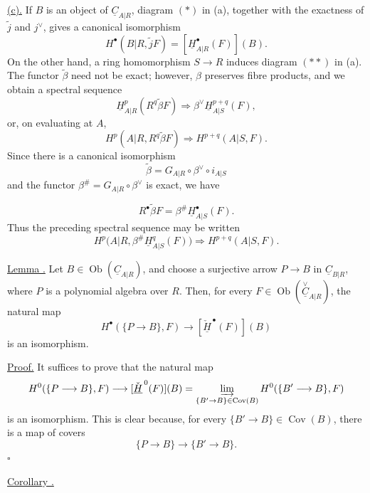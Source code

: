 \underline{(c).} If $B$ is an object of
$\underline C_{A|R}$, diagram $(*)$ in (a), together with the
exactness of $\widetilde j$ and $j^{\vee}$, gives a canonical
isomorphism
\[
 H^{\bullet}(B|R,\widetilde jF)=
 [\underline H^{\bullet}_{A|R}(F)](B).
\]
On the other hand, a ring homomorphism $S\longrightarrow R$ induces
diagram $(**)$ in (a). The functor $\widetilde\beta$ need not be
exact; however, $\beta$ preserves fibre products, and we obtain a
spectral sequence
\[
 \underline H^p_{A|R}(R^q\widetilde\beta F)
 \Longrightarrow
 \beta^{\vee}\underline H^{p+q}_{A|S}(F),
\]
or, on evaluating at $A$,
\[
 H^p(A|R,R^q\widetilde\beta F)
 \Longrightarrow H^{p+q}(A|S,F).
\]
Since there is a canonical isomorphism
\[
 \widetilde\beta=
 G_{A|R}\circ\beta^{\vee}\circ i_{A|S}
\]
and the functor
$\beta^{\#}=G_{A|R}\circ\beta^{\vee}$ is exact, we have


\[
 R^{\bullet}\widetilde\beta F=
 \beta^{\#}\underline H^{\bullet}_{A|S}(F).
\]
Thus the preceding spectral sequence may be written
\[
 H^p\bigl(A|R,\beta^{\#}\underline H^q_{A|S}(F)\bigr)
 \Longrightarrow H^{p+q}(A|S,F).
\]

\underline{Lemma .} Let
$B\in\operatorname{Ob}(\underline C_{A|R})$, and choose a
surjective arrow $P\longrightarrow B$ in $\underline C_{B|R}$,
where $P$ is a polynomial algebra over $R$. Then, for every
$F\in\operatorname{Ob}(\overset{\vee}{\underline C}_{A|R})$, the
natural map
\[
 H^{\bullet}(\{P\longrightarrow B\},F)
 \longrightarrow[\check{\underline H}^{\,\bullet}(F)](B)
\]
is an isomorphism.

\underline{Proof.} It suffices to prove that the natural map
\[
 H^0(\{P\longrightarrow B\},F)
 \longrightarrow[\check{\underline H}^{\,0}(F)](B)
 =\varinjlim_{\{B'\to B\}\in\operatorname{Cov}(B)}
   H^0(\{B'\longrightarrow B\},F)
\]
is an isomorphism. This is clear because, for every
$\{B'\longrightarrow B\}\in\operatorname{Cov}(B)$, there is a map
of covers
\[
 \{P\longrightarrow B\}\longrightarrow
 \{B'\longrightarrow B\}.
\]
\hfill$\square$

\underline{Corollary .}

